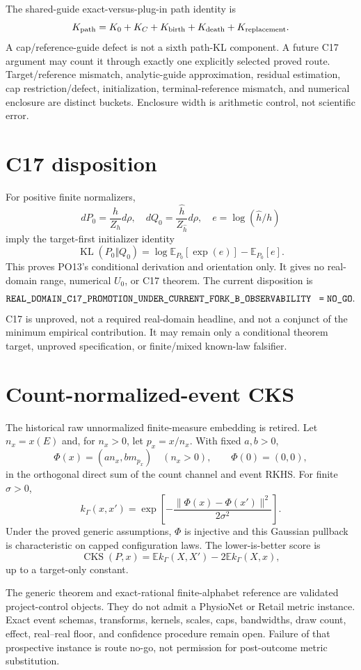 \documentclass[11pt]{article}
\newcommand{\state}[1]{\texttt{#1}}
\begin{document}
The shared-guide exact-versus-plug-in path identity is
\[
K_{\rm path}=K_0+K_C+K_{\rm birth}+K_{\rm death}+K_{\rm replacement}.
\]
A cap/reference-guide defect is not a sixth path-KL component. A future C17
argument may count it through exactly one explicitly selected proved route.
Target/reference mismatch, analytic-guide approximation, residual estimation,
cap restriction/defect, initialization, terminal-reference mismatch, and
numerical enclosure are distinct buckets. Enclosure width is arithmetic
control, not scientific error.

\section{C17 disposition}

For positive finite normalizers,
\[
dP_0=\frac{h}{Z_h}d\rho,\quad
dQ_0=\frac{\widehat h}{Z_{\widehat h}}d\rho,\quad
e=\log(\widehat h/h)
\]
imply the target-first initializer identity
\[
\operatorname{KL}(P_0\Vert Q_0)
=\log\mathbb E_{P_0}[\exp(e)]-\mathbb E_{P_0}[e].
\]
This proves PO13's conditional derivation and orientation only. It gives no
real-domain range, numerical $U_0$, or C17 theorem. The current disposition is
\[
\state{REAL\_DOMAIN\_C17\_PROMOTION\_UNDER\_CURRENT\_FORK\_B\_OBSERVABILITY
\;=\;NO\_GO}.
\]
C17 is unproved, not a required real-domain headline, and not a conjunct of the
minimum empirical contribution. It may remain only a conditional theorem
target, unproved specification, or finite/mixed known-law falsifier.

\section{Count-normalized-event CKS}

The historical raw unnormalized finite-measure embedding is retired. Let
$n_x=x(E)$ and, for $n_x>0$, let $p_x=x/n_x$. With fixed $a,b>0$,
\[
\Phi(x)=(a n_x,b m_{p_x})\quad(n_x>0),\qquad \Phi(0)=(0,0),
\]
in the orthogonal direct sum of the count channel and event RKHS. For finite
$\sigma>0$,
\[
k_\Gamma(x,x')=
\exp\!\left[-\frac{\|\Phi(x)-\Phi(x')\|^2}{2\sigma^2}\right].
\]
Under the proved generic assumptions, $\Phi$ is injective and this Gaussian
pullback is characteristic on capped configuration laws. The lower-is-better
score is
\[
\operatorname{CKS}(P,x)=
\mathbb E k_\Gamma(X,X')-2\mathbb E k_\Gamma(X,x),
\]
up to a target-only constant.

The generic theorem and exact-rational finite-alphabet reference are validated
project-control objects. They do not admit a PhysioNet or Retail metric
instance. Exact event schemas, transforms, kernels, scales, caps, bandwidths,
draw count, effect, real--real floor, and confidence procedure remain open.
Failure of that prospective instance is route no-go, not permission for
post-outcome metric substitution.
\end{document}
